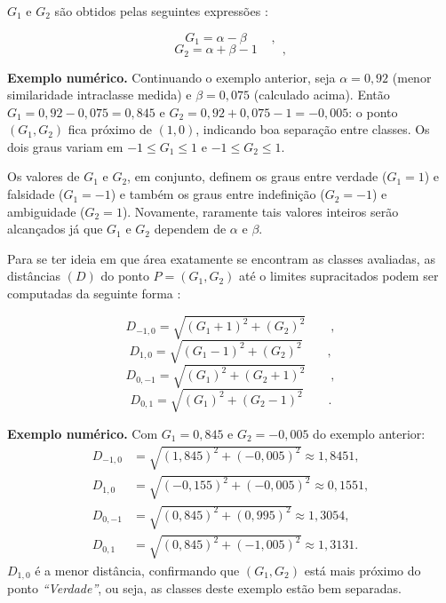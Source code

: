 			\par $G_1$ e $G_2$ são obtidos pelas seguintes expressões \cite{8588433}:

			\begin{equation}
				\label{eq:g1def}
				G_1=\alpha-\beta  \qquad,
			\end{equation}
			\begin{equation}
				\label{eq:g2reuse}
				G_2=\alpha+\beta-1 \qquad,
			\end{equation}
			\par \textbf{Exemplo numérico.} Continuando o exemplo anterior, seja $\alpha=0{,}92$ (menor similaridade intraclasse medida) e $\beta=0{,}075$ (calculado acima). Então $G_1 = 0{,}92-0{,}075 = 0{,}845$ e $G_2 = 0{,}92+0{,}075-1 = -0{,}005$: o ponto $(G_1,G_2)$ fica próximo de $(1,0)$, indicando boa separação entre classes.
			Os dois graus variam em $-1 \leqslant G_1 \leqslant 1$ e $-1 \leqslant G_2 \leqslant 1$.
			
			\par Os valores de $G_1$ e $G_2$, em conjunto, definem os graus entre verdade ($G_1=1$) e falsidade ($G_1=-1$) e também os graus entre indefinição ($G_2=-1$) e ambiguidade ($G_2=1$). Novamente, raramente tais valores inteiros serão alcançados já que $G_1$ e $G_2$ dependem de $\alpha$ e $\beta$.
	
			\par Para se ter ideia em que área exatamente se encontram as classes avaliadas, as distâncias $(D)$ do ponto $P=(G_1,G_2)$ até o limites supracitados podem ser computadas da seguinte forma \cite{8588433}:
	
			\begin{equation}
				D_{-1,0}=\sqrt{(G_1+1)^2+(G_2)^2}\qquad,
			\end{equation}
			\begin{equation}
				D_{1,0}=\sqrt{(G_1-1)^2+(G_2)^2}\qquad,
			\end{equation}
			\begin{equation}
				D_{0,-1}=\sqrt{(G_1)^2+(G_2+1)^2}\qquad,		
			\end{equation}
			\begin{equation}
				D_{0,1}=\sqrt{(G_1)^2+(G_2-1)^2}\qquad.
			\end{equation}
			\par \textbf{Exemplo numérico.} Com $G_1=0{,}845$ e $G_2=-0{,}005$ do exemplo anterior:
			\begin{equation*}
				\begin{aligned}
					D_{-1,0} &= \sqrt{(1{,}845)^2+(-0{,}005)^2} \approx 1{,}8451, \\
					D_{1,0}  &= \sqrt{(-0{,}155)^2+(-0{,}005)^2} \approx 0{,}1551, \\
					D_{0,-1} &= \sqrt{(0{,}845)^2+(0{,}995)^2} \approx 1{,}3054, \\
					D_{0,1}  &= \sqrt{(0{,}845)^2+(-1{,}005)^2} \approx 1{,}3131.
				\end{aligned}
			\end{equation*}
			$D_{1,0}$ é a menor distância, confirmando que $(G_1,G_2)$ está mais próximo do ponto \textit{``Verdade''}, ou seja, as classes deste exemplo estão bem separadas.
			
